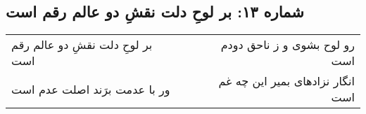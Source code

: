 \begin{center}
\section*{شماره ۱۳: بر لوحِ دلت نقشِ دو عالم رقم است}
\label{sec:013}
\begin{longtable}{l p{0.5cm} r}
بر لوحِ دلت نقشِ دو عالم رقم است
&&
رو لوح بشوی و ز ناحق دودم است
\\
ور با عدمت برَند اصلت عدم است
&&
انگار نزادهای بمیر این چه غم است
\\
\end{longtable}
\end{center}
